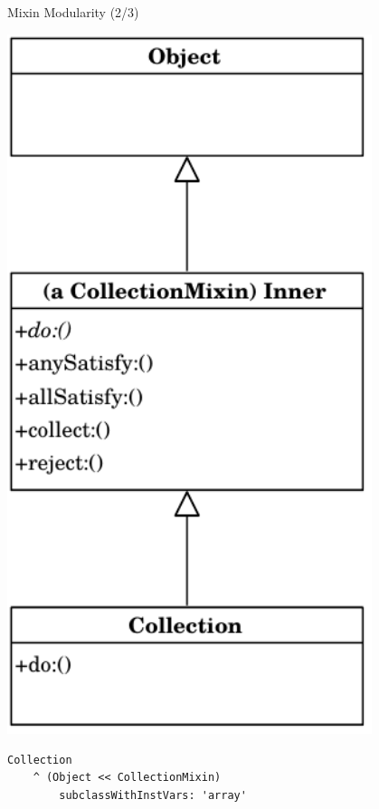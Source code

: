 \documentclass[xcolor=dvipsname, handout]{beamer} %
\begin{document}
\begin{frame}[fragile]{Mixin Modularity (2/3)}
\begin{minipage}{0.3\textwidth}
\centering
\includegraphics[width=0.8\textwidth]{mixin_1.pdf}
\end{minipage} %
\begin{minipage}{0.65\textwidth}
\begin{lstlisting}
Collection
    ^ (Object << CollectionMixin)
        subclassWithInstVars: 'array'
\end{lstlisting}
\end{minipage}
\end{frame}
\end{document}
